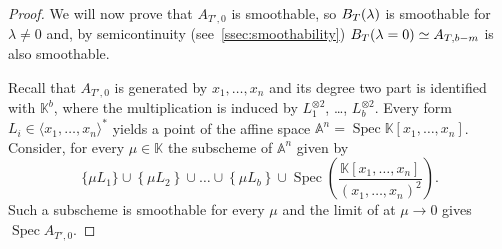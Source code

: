 \documentclass[a4paper,11pt,reqno]{amsart}
\newcommand{\bbK}{\mathbb{K}}
\DeclareMathOperator{\Spec}{Spec}
\numberwithin{equation}{section}
\theoremstyle{definition}
\theoremstyle{plain}
\theoremstyle{remark}
\def\CC{\mathbb{C}}
\begin{document}
\begin{proof}
    We will now prove that $A_{T', 0}$ is smoothable, so $B_{T}(\lambda)$ {is}
    smoothable for $\lambda\neq 0$ and, by semicontinuity
    (see~\autoref{ssec:smoothability}) {$B_{T}(\lambda=0) \simeq
    A_{T, b-m}$ is also smoothable.}

    Recall that $A_{T', 0}$ is generated by $x_1, \ldots ,x_n$ and its degree
    two part is identified with $\bbK^b$, where the multiplication is induced
    by $L_1^{\otimes 2}$, \ldots , $L_b^{\otimes 2}$. Every form $L_i\in \langle x_1, \ldots
    ,x_n\rangle^*$ yields a point of the affine space $\mathbb{A}^n =
    \Spec\bbK[x_1, \ldots ,x_n]$. Consider, for every $\mu\in \bbK$ the
    subscheme of $\mathbb{A}^n$ given by
    \[
        \{\mu L_1\} \cup \left\{ \mu L_2 \right\}\cup  \ldots \cup \left\{
        \mu L_b \right\}\cup \Spec\left( \frac{\bbK[x_1, \ldots ,x_n]}{(x_1, \ldots ,x_n)^2}
        \right).
    \]
    Such a subscheme is smoothable for every $\mu$ and
    the limit of at $\mu\to 0$ {gives} $\Spec A_{T', 0}$.
\end{proof}
\end{document}
